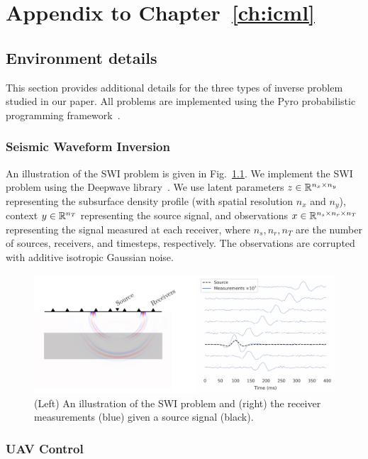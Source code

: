 \chapter{Appendix to Chapter~\ref{ch:icml}}

\section{Environment details}

This section provides additional details for the three types of inverse problem studied in our paper. All problems are implemented using the Pyro probabilistic programming framework~\cite{binghamPyroDeepUniversal2019}.

\subsection{Seismic Waveform Inversion}

An illustration of the SWI problem is given in Fig.~\ref{ch:icml:fig:swi_explainer}. We implement the SWI problem using the Deepwave library~\cite{richardsonDeepwave2023}. We use latent parameters $z \in \mathbb{R}^{n_x \times n_y}$ representing the subsurface density profile (with spatial resolution $n_x$ and $n_y$), context $y \in \mathbb{R}^{n_T}$ representing the source signal, and observations $x \in \mathbb{R}^{n_{s} \times n_{r} \times n_{T}}$ representing the signal measured at each receiver, where $n_s, n_r, n_T$ are the number of sources, receivers, and timesteps, respectively. The observations are corrupted with additive isotropic Gaussian noise.

\begin{figure}[ht]
    \centering
    \includegraphics[width=0.6\linewidth]{images/icml/swi_results/swi_overview.pdf}
    \caption{(Left) An illustration of the SWI problem and (right) the receiver measurements (blue) given a source signal (black).}
    \label{ch:icml:fig:swi_explainer}
\end{figure}

\subsection{UAV Control}


